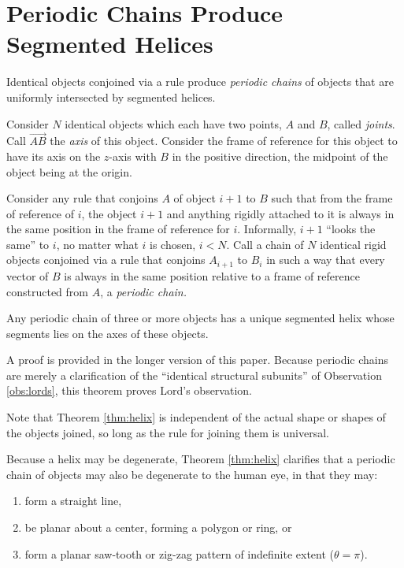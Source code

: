\documentclass{svproc}
\begin{document}
\label{sec:SegmentedHelix}

\section{Periodic Chains Produce Segmented Helices}

Identical objects conjoined via a rule
produce {\em periodic chains} of objects that are uniformly intersected
by segmented helices.


\begin{theorem}
  \label{thm:helix}
  Consider $N$ identical objects which each have two points, $A$ and $B$, called {\em joints}. Call
  $\overrightarrow{AB}$ the {\em axis} of this object.
  Consider the frame of reference for this object to have
  its axis on the $z$-axis with $B$ in the positive direction, the
  midpoint of the object being at the origin.

  Consider any rule that conjoins $A$ of object $i+1$ to $B$ such that
  from the frame of reference of $i$, the object $i+1$ and anything rigidly
  attached to it is always in the same position in the frame of reference for $i$.
  Informally, $i+1$ ``looks the same'' to $i$, no matter what $i$ is chosen, $i < N$.
  Call a chain of $N$ identical rigid objects conjoined via a rule that
  conjoins $A_{i+1}$ to $B_i$ in such a way that every vector
  of $B$ is always in the same position relative to a frame of reference
  constructed from $A$, a {\em periodic chain.}

  Any periodic chain of three or more objects has a unique segmented helix
  whose segments
  lies on the axes of these objects.
\end{theorem}

A proof is provided in the longer version of this paper\cite{readfullsegmentedhelix}.
Because periodic chains are merely a clarification of the ``identical structural subunits''
of Observation \ref{obs:lords},
this theorem proves Lord's observation.

Note that Theorem \ref{thm:helix} is independent of the actual
shape or shapes of the objects joined, so long as the rule for joining them
is universal.

Because a helix may be degenerate, Theorem \ref{thm:helix} clarifies that
a periodic chain of objects may also be degenerate to the human eye, in that they may:
\begin{enumerate}
\item form a straight line,
\item be planar about a center, forming a polygon or ring, or
\item form a planar saw-tooth or zig-zag pattern of indefinite extent ($\theta = \pi$).
\end{enumerate}
\end{document}
